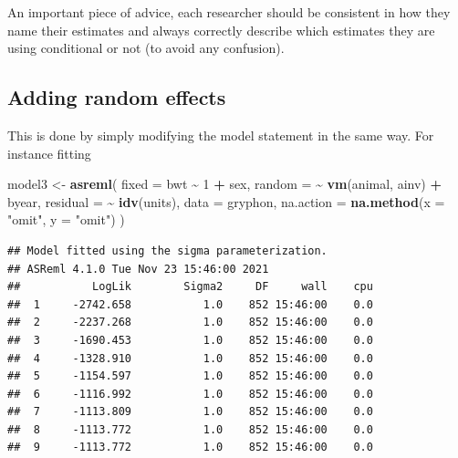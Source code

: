 \documentclass[
  12pt,
]{book}
\newenvironment{Shaded}{\begin{snugshade}}{\end{snugshade}}
\newcommand{\DataTypeTok}[1]{\textcolor[rgb]{0.13,0.29,0.53}{#1}}
\newcommand{\DecValTok}[1]{\textcolor[rgb]{0.00,0.00,0.81}{#1}}
\newcommand{\KeywordTok}[1]{\textcolor[rgb]{0.13,0.29,0.53}{\textbf{#1}}}
\newcommand{\NormalTok}[1]{#1}
\newcommand{\OperatorTok}[1]{\textcolor[rgb]{0.81,0.36,0.00}{\textbf{#1}}}
\newcommand{\StringTok}[1]{\textcolor[rgb]{0.31,0.60,0.02}{#1}}
\begin{document}
An important piece of advice, each researcher should be consistent in how they name their estimates and always correctly describe which estimates they are using conditional or not (to avoid any confusion).

\hypertarget{adding-random-effects}{%
\subsection{Adding random effects}\label{adding-random-effects}}

This is done by simply modifying the model statement in the same way. For instance fitting

\begin{Shaded}
\begin{Highlighting}[]
\NormalTok{model3 \textless{}{-}}\StringTok{ }\KeywordTok{asreml}\NormalTok{(}
  \DataTypeTok{fixed =}\NormalTok{ bwt }\OperatorTok{\textasciitilde{}}\StringTok{ }\DecValTok{1} \OperatorTok{+}\StringTok{ }\NormalTok{sex,}
  \DataTypeTok{random =} \OperatorTok{\textasciitilde{}}\StringTok{ }\KeywordTok{vm}\NormalTok{(animal, ainv) }\OperatorTok{+}\StringTok{ }\NormalTok{byear,}
  \DataTypeTok{residual =} \OperatorTok{\textasciitilde{}}\StringTok{ }\KeywordTok{idv}\NormalTok{(units),}
  \DataTypeTok{data =}\NormalTok{ gryphon,}
  \DataTypeTok{na.action =} \KeywordTok{na.method}\NormalTok{(}\DataTypeTok{x =} \StringTok{"omit"}\NormalTok{, }\DataTypeTok{y =} \StringTok{"omit"}\NormalTok{)}
\NormalTok{)}
\end{Highlighting}
\end{Shaded}

\begin{verbatim}
## Model fitted using the sigma parameterization.
## ASReml 4.1.0 Tue Nov 23 15:46:00 2021
##           LogLik        Sigma2     DF     wall    cpu
##  1     -2742.658           1.0    852 15:46:00    0.0
##  2     -2237.268           1.0    852 15:46:00    0.0
##  3     -1690.453           1.0    852 15:46:00    0.0
##  4     -1328.910           1.0    852 15:46:00    0.0
##  5     -1154.597           1.0    852 15:46:00    0.0
##  6     -1116.992           1.0    852 15:46:00    0.0
##  7     -1113.809           1.0    852 15:46:00    0.0
##  8     -1113.772           1.0    852 15:46:00    0.0
##  9     -1113.772           1.0    852 15:46:00    0.0
\end{verbatim}

\begin{Shaded}
\end{Shaded}
\end{document}
